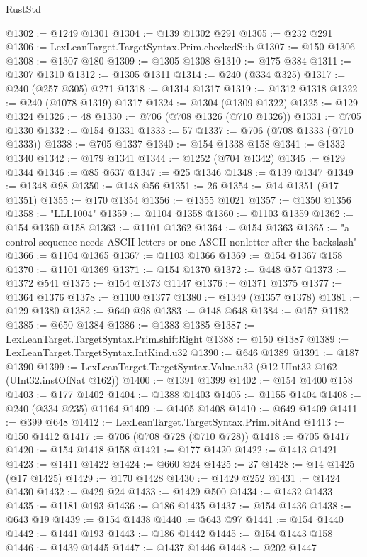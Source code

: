 \begin{lexlean}{RustStd}
\begin{coremodule}
{\begin{coremodule}
{{{{{{{{{{{{{{{{{{{{{{{{{{{{{{{{{{{{{{{@1302 := @1249 @1301
@1304 := @139 @1302 @291
@1305 := @232 @291
@1306 := LexLeanTarget.TargetSyntax.Prim.checkedSub
@1307 := @150 @1306
@1308 := @1307 @180
@1309 := @1305 @1308
@1310 := @175 @384
@1311 := @1307 @1310
@1312 := @1305 @1311
@1314 := @240 (@334 @325)
@1317 := @240 (@257 @305) @271
@1318 := @1314 @1317
@1319 := @1312 @1318
@1322 := @240 (@1078 @1319) @1317
@1324 := @1304 (@1309 @1322)
@1325 := @129 @1324
@1326 := 48
@1330 := @706 (@708 @1326 (@710 @1326))
@1331 := @705 @1330
@1332 := @154 @1331
@1333 := 57
@1337 := @706 (@708 @1333 (@710 @1333))
@1338 := @705 @1337
@1340 := @154 @1338 @158
@1341 := @1332 @1340
@1342 := @179 @1341
@1344 := @1252 (@704 @1342)
@1345 := @129 @1344
@1346 := @85 @637
@1347 := @25 @1346
@1348 := @139 @1347
@1349 := @1348 @98
@1350 := @148 @56
@1351 := 26
@1354 := @14 @1351 (@17 @1351)
@1355 := @170 @1354
@1356 := @1355 @1021
@1357 := @1350 @1356
@1358 := "LLL1004"
@1359 := @1104 @1358
@1360 := @1103 @1359
@1362 := @154 @1360 @158
@1363 := @1101 @1362
@1364 := @154 @1363
@1365 := "a control sequence needs ASCII letters or one ASCII nonletter after the backslash"
@1366 := @1104 @1365
@1367 := @1103 @1366
@1369 := @154 @1367 @158
@1370 := @1101 @1369
@1371 := @154 @1370
@1372 := @448 @57
@1373 := @1372 @541
@1375 := @154 @1373 @1147
@1376 := @1371 @1375
@1377 := @1364 @1376
@1378 := @1100 @1377
@1380 := @1349 (@1357 @1378)
@1381 := @129 @1380
@1382 := @640 @98
@1383 := @148 @648
@1384 := @157 @1182
@1385 := @650 @1384
@1386 := @1383 @1385
@1387 := LexLeanTarget.TargetSyntax.Prim.shiftRight
@1388 := @150 @1387
@1389 := LexLeanTarget.TargetSyntax.IntKind.u32
@1390 := @646 @1389
@1391 := @187 @1390
@1399 := LexLeanTarget.TargetSyntax.Value.u32 (@12 UInt32 @162 (UInt32.instOfNat @162))
@1400 := @1391 @1399
@1402 := @154 @1400 @158
@1403 := @177 @1402
@1404 := @1388 @1403
@1405 := @1155 @1404
@1408 := @240 (@334 @235) @1164
@1409 := @1405 @1408
@1410 := @649 @1409
@1411 := @399 @648
@1412 := LexLeanTarget.TargetSyntax.Prim.bitAnd
@1413 := @150 @1412
@1417 := @706 (@708 @728 (@710 @728))
@1418 := @705 @1417
@1420 := @154 @1418 @158
@1421 := @177 @1420
@1422 := @1413 @1421
@1423 := @1411 @1422
@1424 := @660 @24
@1425 := 27
@1428 := @14 @1425 (@17 @1425)
@1429 := @170 @1428
@1430 := @1429 @252
@1431 := @1424 @1430
@1432 := @429 @24
@1433 := @1429 @500
@1434 := @1432 @1433
@1435 := @1181 @193
@1436 := @186 @1435
@1437 := @154 @1436
@1438 := @643 @19
@1439 := @154 @1438
@1440 := @643 @97
@1441 := @154 @1440
@1442 := @1441 @193
@1443 := @186 @1442
@1445 := @154 @1443 @158
@1446 := @1439 @1445
@1447 := @1437 @1446
@1448 := @202 @1447
}}}}}}}}}}}}}}}}}}}}}}}}}}}}}}}}}}}}}}}
\end{coremodule}}
\end{coremodule}
\end{lexlean}
